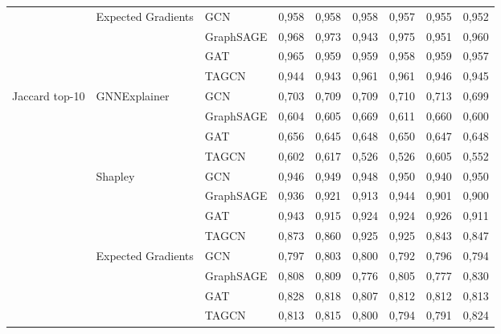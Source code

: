 \begin{tabular}{lllcccccc}
 & Expected Gradients & GCN & 0{,}958 & 0{,}958 & 0{,}958 & 0{,}957 & 0{,}955 & 0{,}952 \\
 &  & GraphSAGE & 0{,}968 & 0{,}973 & 0{,}943 & 0{,}975 & 0{,}951 & 0{,}960 \\
 &  & GAT & 0{,}965 & 0{,}959 & 0{,}959 & 0{,}958 & 0{,}959 & 0{,}957 \\
 &  & TAGCN & 0{,}944 & 0{,}943 & 0{,}961 & 0{,}961 & 0{,}946 & 0{,}945 \\
\midrule
Jaccard top-10 & GNNExplainer & GCN & 0{,}703 & 0{,}709 & 0{,}709 & 0{,}710 & 0{,}713 & 0{,}699 \\
 &  & GraphSAGE & 0{,}604 & 0{,}605 & 0{,}669 & 0{,}611 & 0{,}660 & 0{,}600 \\
 &  & GAT & 0{,}656 & 0{,}645 & 0{,}648 & 0{,}650 & 0{,}647 & 0{,}648 \\
 &  & TAGCN & 0{,}602 & 0{,}617 & 0{,}526 & 0{,}526 & 0{,}605 & 0{,}552 \\
 & Shapley & GCN & 0{,}946 & 0{,}949 & 0{,}948 & 0{,}950 & 0{,}940 & 0{,}950 \\
 &  & GraphSAGE & 0{,}936 & 0{,}921 & 0{,}913 & 0{,}944 & 0{,}901 & 0{,}900 \\
 &  & GAT & 0{,}943 & 0{,}915 & 0{,}924 & 0{,}924 & 0{,}926 & 0{,}911 \\
 &  & TAGCN & 0{,}873 & 0{,}860 & 0{,}925 & 0{,}925 & 0{,}843 & 0{,}847 \\
 & Expected Gradients & GCN & 0{,}797 & 0{,}803 & 0{,}800 & 0{,}792 & 0{,}796 & 0{,}794 \\
 &  & GraphSAGE & 0{,}808 & 0{,}809 & 0{,}776 & 0{,}805 & 0{,}777 & 0{,}830 \\
 &  & GAT & 0{,}828 & 0{,}818 & 0{,}807 & 0{,}812 & 0{,}812 & 0{,}813 \\
 &  & TAGCN & 0{,}813 & 0{,}815 & 0{,}800 & 0{,}794 & 0{,}791 & 0{,}824 \\
\bottomrule
\end{tabular}
